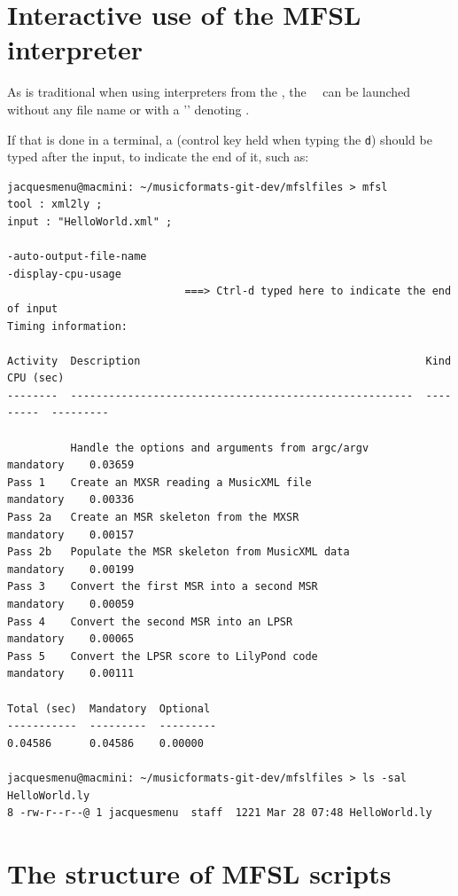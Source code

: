 \section{Interactive use of the MFSL interpreter}

As is traditional when using interpreters from the \CLI, the \mfslInterp\ \mfslExec\ can be launched without any file name or with a '\code{-}' denoting \standardInput.

If that is done in a terminal, a  (control key held when typing the {\tt d}) should be typed after the input, to indicate the end of it, such as:
\begin{lstlisting}[language=Terminal]
jacquesmenu@macmini: ~/musicformats-git-dev/mfslfiles > mfsl
tool : xml2ly ;
input : "HelloWorld.xml" ;

-auto-output-file-name
-display-cpu-usage
							===> Ctrl-d typed here to indicate the end of input
Timing information:

Activity  Description                                             Kind       CPU (sec)
--------  ------------------------------------------------------  ---------  ---------

          Handle the options and arguments from argc/argv         mandatory    0.03659
Pass 1    Create an MXSR reading a MusicXML file                  mandatory    0.00336
Pass 2a   Create an MSR skeleton from the MXSR                    mandatory    0.00157
Pass 2b   Populate the MSR skeleton from MusicXML data            mandatory    0.00199
Pass 3    Convert the first MSR into a second MSR                 mandatory    0.00059
Pass 4    Convert the second MSR into an LPSR                     mandatory    0.00065
Pass 5    Convert the LPSR score to LilyPond code                 mandatory    0.00111

Total (sec)  Mandatory  Optional
-----------  ---------  ---------
0.04586      0.04586    0.00000

jacquesmenu@macmini: ~/musicformats-git-dev/mfslfiles > ls -sal HelloWorld.ly
8 -rw-r--r--@ 1 jacquesmenu  staff  1221 Mar 28 07:48 HelloWorld.ly
\end{lstlisting}


\section{The structure of MFSL scripts}

